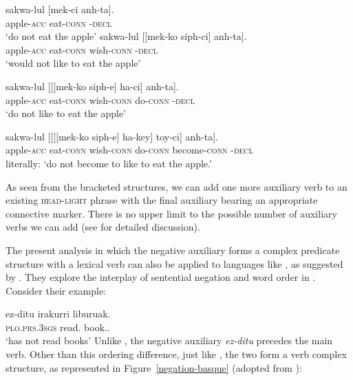 \documentclass[output=paper
 	        ,biblatex
                ,babelshorthands
                ,newtxmath
                ,draftmode
                ,colorlinks, citecolor=brown
]{langscibook}
\begin{document}
\begin{exe}
\begin{xlist}
\begin{exe}
\begin{xlist}
\eal
\ex
\gll sakwa-lul          [mek-ci anh-ta]. \\
     apple-\textsc{acc} \spacebr{}eat-\textsc{conn} \NEG-\textsc{decl} \\
\glt `do not eat the apple'
\ex
\gll sakwa-lul          [[mek-ko siph-ci] anh-ta]. \\
     apple-\textsc{acc} \hphantom{[[}eat-\textsc{conn} wish-\textsc{conn} \NEG-\textsc{decl} \\
\glt `would not like to eat the apple'

\ex \label{negation-20c}
\gll sakwa-lul          [[[mek-ko siph-e] ha-ci] anh-ta]. \\
     apple-\textsc{acc} \hphantom{[[[}eat-\textsc{conn} wish-\textsc{conn} do-\textsc{conn} \NEG-\textsc{decl} \\
\glt `do not like to eat the apple'

\ex
\gll sakwa-lul          [[[[mek-ko siph-e] ha-key] toy-ci] anh-ta]. \\
     apple-\textsc{acc} \hphantom{[[[[}eat-\textsc{conn} wish-\textsc{conn} do-\textsc{conn} become-\textsc{conn} \NEG-\textsc{decl} \\
\glt literally: `do not become to like to eat the apple.'
\end{xlist} \end{exe}
%
As seen from the bracketed structures, we can add one more auxiliary verb to
an existing \textsc{head-light} phrase with the final auxiliary bearing an appropriate
  connective marker. There is no upper limit to the possible number  of auxiliary
  verbs we can add (see \citealt[]{Kim:16} for detailed discussion).

The present analysis in which the  negative auxiliary forms a complex
predicate structure with a lexical verb can also be applied to languages
like , as suggested by \citet{CB:11}. They explore the interplay of sentential
negation and word order in . Consider their example:

\ea
\label{negation-basque-ex}
\gll ez-ditu irakurri liburuak. \\
     \textsc{plo}.\textsc{prs}.\textsc{3sgs} read.\PRF{} book.\ABS.\pl\\
\glt `has not read books'
\z
%
%
Unlike , the negative auxiliary \textit{ez-ditu} precedes
the main verb. Other than this ordering difference, just
like , the two form a verb complex structure, as represented in
Figure~\ref{negation-basque} (adopted from \citealt{CB:11}):


\end{xlist}
\end{exe}
\end{document}
